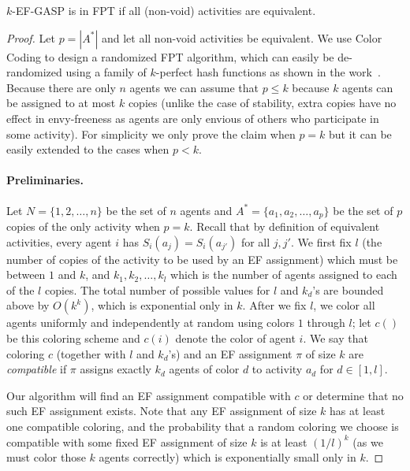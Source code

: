 \begin{theorem}  \label{GASP:thm:ef_fpt_equiv}
$k$-EF-GASP is in FPT if all (non-void) activities are equivalent.
%
\end{theorem}
\begin{proof}
Let $p=|A^*|$ and let all non-void activities be equivalent.
We use Color Coding to design a randomized FPT algorithm, which can easily be de-randomized using a family of $k$-perfect hash functions as shown in the work~\cite{ColorCoding}. 
Because there are only $n$ agents we can assume that $p \leq k$ because $k$ agents can be assigned to at most $k$ copies (unlike the case of stability, extra copies have no effect in envy-freeness as agents are only envious of others who participate in some activity).
For simplicity we only prove the claim when $p = k$ but it can be easily extended to the cases when $p < k$. 

\paragraph{Preliminaries.}
Let $N = \{1, 2, \dots, n\}$ be the set of $n$ agents and $A^* = \{a_1, a_2, \dots, a_p\}$ be the set of $p$ copies of the only activity when $p = k$. Recall that by definition of equivalent activities, every agent $i$ has $S_i(a_j) = S_i(a_{j'})$ for all $j,j'$.
We first fix $l$ (the number of copies of the activity to be used by an EF assignment) which must be between $1$ and $k$, and $k_1, k_2, \dots, k_l$ which is the number of agents assigned to each of the $l$ copies.
The total number of possible values for $l$ and $k_d$'s are bounded above by $O(k^k)$, which is exponential only in $k$.
After we fix $l$, we color all agents uniformly and independently at random using colors $1$ through $l$; let $c()$ be this coloring scheme and $c(i)$ denote the color of agent $i$. 
We say that coloring $c$ (together with $l$ and $k_d$'s) and an EF assignment $\pi$ of size $k$ are {\em compatible} if $\pi$ assigns exactly $k_d$ agents of color $d$ to activity $a_d$ for $d\in [1, l]$.

Our algorithm will find an EF assignment compatible with $c$ or determine that no such EF assignment exists. 
Note that any EF assignment of size $k$ has at least one compatible coloring, and the probability that a random coloring we choose is compatible with some fixed EF assignment of size $k$ is at least $(1/l)^k$ (as we must color those $k$ agents correctly) which is exponentially small only in $k$. 


\end{proof}
